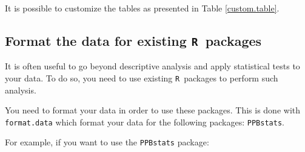 \documentclass{article}\usepackage[]{graphicx}\usepackage[]{color}
\newcommand{\R}{\texttt{R}}
\newcommand{\listpackformatdata}{\texttt{PPBstats}}
\begin{document}
\begin{itemize}
It is possible to customize the tables as presented in Table \ref{custom.table}.

\subsection{Format the data for existing \R~packages}

It is often useful to go beyond descriptive analysis and apply statistical tests to your data.
To do so, you need to use existing \R~packages to perform such analysis.

You need to format your data in order to use these packages. 
This is done with \texttt{format.data} which format your data for the following packages: \listpackformatdata.

For example, if you want to use the \texttt{PPBstats} package:


\end{itemize}
\end{document}
